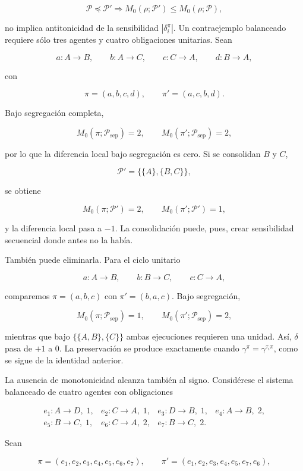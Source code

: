 \documentclass[10pt,a5paper,twoside]{article}
\begin{document}
\[
\mathcal P\preceq\mathcal P'
\Longrightarrow
M_0(\rho;\mathcal P')\le M_0(\rho;\mathcal P),
\]

no implica antitonicidad de la sensibilidad \(|\delta_i^\pi|\). Un
contraejemplo balanceado requiere sólo tres agentes y cuatro obligaciones
unitarias. Sean

\[
a:A\to B,\qquad b:A\to C,\qquad
c:C\to A,\qquad d:B\to A,
\]

con

\[
\pi=(a,b,c,d),
\qquad
\pi'=(a,c,b,d).
\]

Bajo segregación completa,

\[
M_0(\pi;\mathcal P_{\mathrm{sep}})=2,
\qquad
M_0(\pi';\mathcal P_{\mathrm{sep}})=2,
\]

por lo que la diferencia local bajo segregación es cero. Si se consolidan
\(B\) y \(C\),

\[
\mathcal P'=\{\{A\},\{B,C\}\},
\]

se obtiene

\[
M_0(\pi;\mathcal P')=2,
\qquad
M_0(\pi';\mathcal P')=1,
\]

y la diferencia local pasa a \(-1\). La consolidación puede, pues,
crear sensibilidad secuencial donde antes no la había.

También puede eliminarla. Para el ciclo unitario

\[
a:A\to B,\qquad b:B\to C,\qquad c:C\to A,
\]

comparemos \(\pi=(a,b,c)\) con \(\pi'=(b,a,c)\). Bajo segregación,

\[
M_0(\pi;\mathcal P_{\mathrm{sep}})=1,
\qquad
M_0(\pi';\mathcal P_{\mathrm{sep}})=2,
\]

mientras que bajo \(\{\{A,B\},\{C\}\}\) ambas ejecuciones requieren
una unidad. Así, \(\delta\) pasa de \(+1\) a \(0\). La preservación se
produce exactamente cuando \(\gamma^\pi=\gamma^{\tau_i\pi}\), como
se sigue de la identidad anterior.

La ausencia de monotonicidad alcanza también al signo. Considérese el
sistema balanceado de cuatro agentes con obligaciones

\[
\begin{array}{llll}
e_1:A\to D,\;1, & e_2:C\to A,\;1, & e_3:D\to B,\;1, & e_4:A\to B,\;2,\\
e_5:B\to C,\;1, & e_6:C\to A,\;2, & e_7:B\to C,\;2. &
\end{array}
\]

Sean

\[
\pi=(e_1,e_2,e_3,e_4,e_5,e_6,e_7),
\qquad
\pi'=(e_1,e_2,e_3,e_4,e_5,e_7,e_6),
\]
\end{document}
